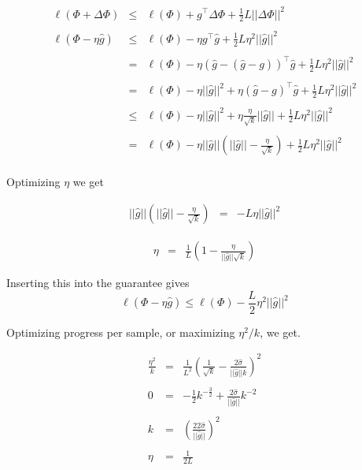 {{\begin{eqnarray*}
 \ell(\Phi + \Delta \Phi) & \leq &   \ell(\Phi) + g^\top \Delta \Phi + \frac{1}{2} L ||\Delta \Phi||^2 \\
  \\
\ell(\Phi - \eta\widehat{g}) & \leq & \ell(\Phi) - \eta g^\top \widehat{g} + \frac{1}{2}L \eta^2 ||\widehat{g}||^2\\
  \\
  & = &  \ell(\Phi) - \eta (\widehat{g} - (\widehat{g} -g))^\top \widehat{g} + \frac{1}{2}L\eta^2 ||\widehat{g}||^2 \\
  \\
  & = &  \ell(\Phi) - \eta ||\widehat{g}||^2 + \eta(\widehat{g} -g)^\top \widehat{g} + \frac{1}{2}L \eta^2 ||\widehat{g}||^2 \\
  \\
  & \leq &  \ell(\Phi) - \eta ||\widehat{g}||^2 + \eta\frac{\eta}{\sqrt{k}}||\widehat{g}|| + \frac{1}{2}L \eta^2 ||\widehat{g}||^2 \\
  \\
  & = & \ell(\Phi) - \eta ||\widehat{g}||\left(||\widehat{g}|| - \frac{\eta}{\sqrt{k}} \right)  + \frac{1}{2}L \eta^2 ||\widehat{g}||^2 \\
\end{eqnarray*}


Optimizing $\eta$ we get

\begin{eqnarray*}
 ||\widehat{g}||\left(||\widehat{g}|| - \frac{\eta}{\sqrt{k}} \right) & = & - L \eta ||\widehat{g}||^2
\end{eqnarray*}


\begin{eqnarray*}
\eta & = & \frac{1}{L}\left(1 - \frac{\eta}{||\widehat{g}||\sqrt{k}}\right)
\end{eqnarray*}

\vfill
Inserting this into the guarantee gives
$$\ell(\Phi - \eta \widehat{g}) \leq \ell(\Phi) - \frac{L}{2}\eta^2||\widehat{g}||^2$$


Optimizing progress per sample, or maximizing $\eta^2/k$, we get.

\begin{eqnarray*}
\frac{\eta^2}{k} & = & \frac{1}{L^2}\left(\frac{1}{\sqrt{k}} - \frac{2\hat{\sigma}}{||\widehat{g}||k}\right)^2 \\
\\
0 & = &  - \frac{1}{2} k^{-\frac{3}{2}} + \frac{2\hat{\sigma}}{||\widehat{g}||} k^{-2} \nonumber \\
\\
k & = & \left(\frac{22\hat{\sigma}}{||\widehat{g}||}\right)^2 \\
\\
\eta & = & \frac{1}{2L}
\end{eqnarray*}
}



} 

